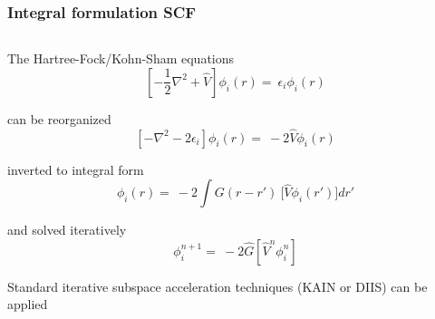\begin{frame}
    \frametitle{Integral formulation SCF}
    \begin{columns}
    \begin{column}[b]{0.4\textwidth}

    \centering
    The Hartree-Fock/Kohn-Sham equations
    \begin{equation}
        \nonumber
        \left[-\frac{1}{2}\nabla^2 + \hat{V}\right]
        \phi_i(r) =\ \epsilon_i \phi_i(r)
    \end{equation}

    \vspace{5mm}
    can be reorganized
    \begin{equation}
        \nonumber
        \left[-\nabla^2 - 2\epsilon_i\right]\phi_i(r) =\ 
        -2\hat{V}\phi_i(r)
    \end{equation}

    \vspace{5mm}
    inverted to integral form
    \begin{equation}
        \nonumber
        \phi_i(r) =\ -2\int G(r-r')\
        \Big[\hat{V} \phi_i(r')\Big] dr'
    \end{equation}

    \vspace{5mm}
    and solved iteratively
    \begin{equation}
        \nonumber
        \phi_i^{n+1} =\ -2\hat{G}\left[\hat{V}^n\phi_i^n\right]
    \end{equation}

    \vspace{5mm}
    Standard iterative subspace acceleration 
    techniques (KAIN or DIIS) can be applied
    \vspace{5mm}
    \end{column}


\end{columns}
\end{frame}
